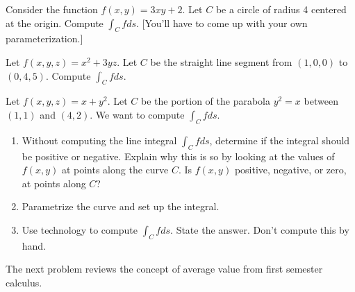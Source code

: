 \begin{problem}%
 Consider the function $f(x,y)=3xy+2$. Let $C$ be a circle of radius 4 centered at the origin.  Compute $\int_C fds$.  [You'll have to come up with your own parameterization.]
\end{problem}


\begin{problem}%
 Let $f(x,y,z)=x^2+3yz$. Let $C$ be the straight line segment from $(1,0,0)$ to $(0,4,5)$. Compute $\int_C f ds$. 
\end{problem}

\begin{problem}
 Let $f(x,y,z)=x+y^2$. Let $C$ be the portion of the parabola $y^2=x$ between $(1,1)$ and $(4,2)$. We want to compute $\int_C fds$.  
\begin{enumerate}
 \item Without computing the line integral $\int_C fds$, determine if the integral should be positive or negative. Explain why this is so by looking at the values of $f(x,y)$ at points along the curve $C$.  Is $f(x,y)$ positive, negative, or zero, at points along $C$?
 \item Parametrize the curve and set up the integral.
 \item Use technology to compute $\int_C fds$. State the answer. Don't compute this by hand.
\end{enumerate}
\end{problem}

The next problem reviews the concept of average value from first semester calculus.

